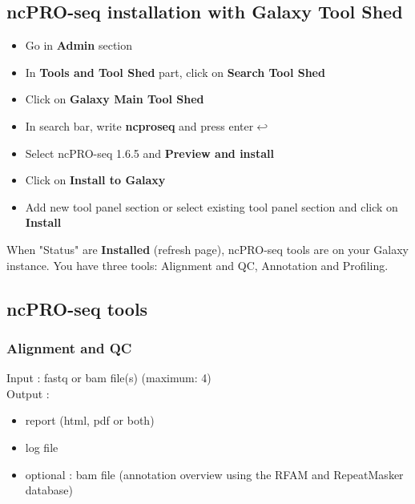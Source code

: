 \documentclass[12pt]{article}
\def \ncpip{ncPRO-seq 1.6.5}
\begin{document}
\subsection{ncPRO-seq installation with Galaxy Tool Shed}

\begin{itemize}
 \item Go in \textbf{Admin} section
 \item In \textbf{Tools and Tool Shed} part, click on \textbf{Search Tool Shed}
 \item Click on \textbf{Galaxy Main Tool Shed}
 \item In search bar, write \textbf{ncproseq} and press enter$ \hookleftarrow $
 \item Select \ncpip{} and \textbf{Preview and install}
 \item Click on \textbf{Install to Galaxy}
 \item Add new tool panel section or select existing tool panel section and click on \textbf{Install}
\end{itemize}

When "Status" are \textbf{Installed} (refresh page), ncPRO-seq tools are on your Galaxy instance. You have three tools: Alignment and QC, Annotation and Profiling.

\subsection{ncPRO-seq tools}

\subsubsection{Alignment and QC}

Input : fastq or bam file(s) (maximum: 4)\\
Output : 
\begin{itemize}
 \item report (html, pdf or both)
 \item log file
 \item optional : bam file (annotation overview using the RFAM and RepeatMasker database)
\end{itemize}
\end{document}
